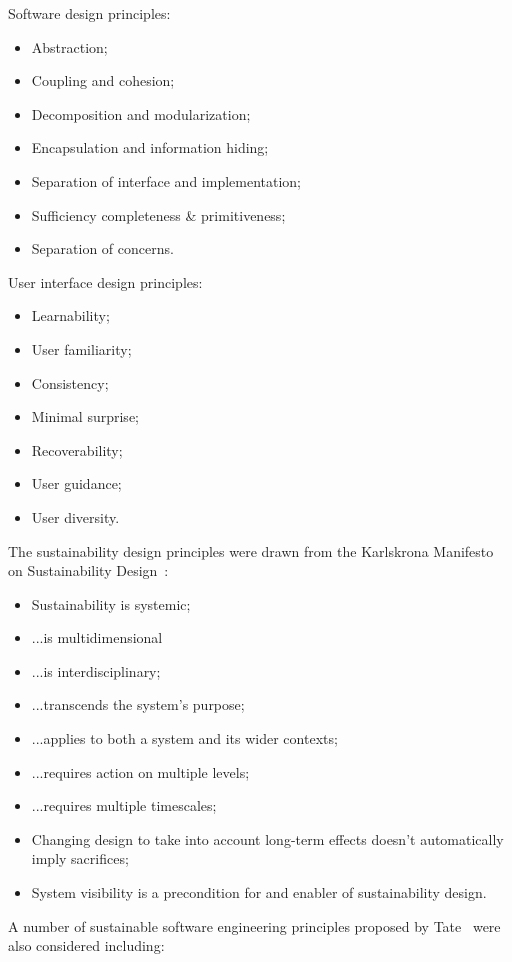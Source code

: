 Software design principles:
\begin{itemize}
\item Abstraction;
\item Coupling and cohesion;
\item Decomposition and modularization;
\item Encapsulation and information hiding;
\item Separation of interface and implementation;
\item Sufficiency completeness \& primitiveness;
\item Separation of concerns.
\end{itemize}

User interface design principles:
\begin{itemize}
\item Learnability;
\item User familiarity;
\item Consistency;
\item Minimal surprise;
\item Recoverability;
\item User guidance;
\item User diversity.
\end{itemize}

The sustainability design principles were drawn from the Karlskrona Manifesto on Sustainability Design~\cite{Becker:2014}:
\begin{itemize}
\item Sustainability is systemic;
\item ...is multidimensional
\item ...is interdisciplinary;
\item ...transcends the system's purpose;
\item ...applies to both a system and its wider contexts;
\item ...requires action on multiple levels;
\item ...requires multiple timescales;
\item Changing design to take into account long-term effects doesn't automatically imply sacrifices;
\item System visibility is a precondition for and enabler of sustainability design.
\end{itemize}

A number of sustainable software engineering principles proposed by Tate~\cite{tate2005} were also considered including:

